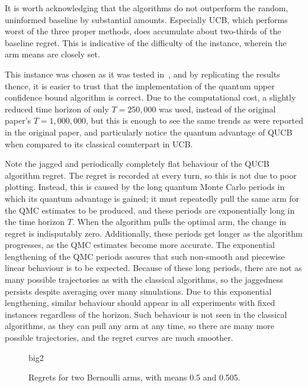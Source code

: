 It is worth acknowledging that the algorithms do not outperform the random, uninformed baseline by substantial amounts.
Especially UCB, which performs worst of the three proper methods, does accumulate about two-thirds of the baseline regret.
This is indicative of the difficulty of the instance, wherein the arm means are closely set.

This instance was chosen as it was tested in~\autocite{wan2022}, and by replicating the results thence, it is easier to trust that the implementation of the quantum upper confidence bound algorithm is correct.
Due to the computational cost, a slightly reduced time horizon of only $T=250,000$ was used, instead of the original paper's $T=1,000,000$, but this is enough to see the same trends as were reported in the original paper, and particularly notice the quantum advantage of QUCB when compared to its classical counterpart in UCB.

Note the jagged and periodically completely flat behaviour of the QUCB algorithm regret.
The regret is recorded at every turn, so this is not due to poor plotting.
Instead, this is caused by the long quantum Monte Carlo periods in which its quantum advantage is gained; it must repeatedly pull the same arm for the QMC estimates to be produced, and these periods are exponentially long in the time horizon $T$.
When the algorithm pulls the optimal arm, the change in regret is indisputably zero.
Additionally, these periods get longer as the algorithm progresses, as the QMC estimates become more accurate.
The exponential lengthening of the QMC periods assures that such non-smooth and piecewise linear behaviour is to be expected.
Because of these long periods, there are not as many possible trajectories as with the classical algorithms, so the jaggedness persists despite averaging over many simulations.
Due to this exponential lengthening, similar behaviour should appear in all experiments with fixed instances regardless of the horizon.
Such behaviour is not seen in the classical algorithms, as they can pull any arm at any time, so there are many more possible trajectories, and the regret curves are much smoother.

\begin{figure}[p]
    \centering
    \newcommand{\myoptions}{
        width=10cm,
        height=8cm,
        xlabel={Kiloturn},
        ylabel={Regret},
        legend entries={Baseline, UCB, QUCB, Thompson},
        legend pos=north west,
        legend cell align=left,
        mystyle,
    }
    {big2}
    \caption[
        Regrets for two Bernoulli arms, with means 0.5 and 0.505.
    ]{
        Regrets for two Bernoulli arms, with means 0.5 and 0.505.
    }
    \label{fig:big2}
\end{figure}


